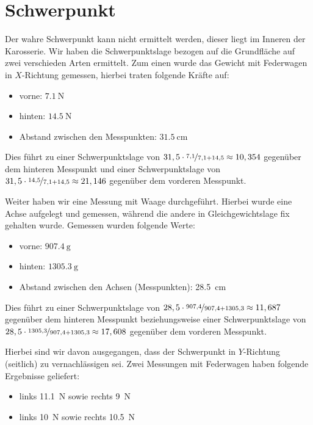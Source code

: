 \documentclass[10pt]{article}
\begin{document}
\section{Schwerpunkt}
    Der wahre Schwerpunkt kann nicht ermittelt werden, dieser liegt im Inneren der Karosserie.
    Wir haben die Schwerpunktslage bezogen auf die Grundfläche auf zwei verschieden Arten ermittelt.
    Zum einen wurde das Gewicht mit Federwagen in $X$-Richtung gemessen, hierbei traten folgende Kräfte auf:
    \begin{itemize}
    \item vorne: $\SI{7,1}{\newton}$
    \item hinten: $\SI{14,5}{\newton}$
    \item Abstand zwischen den Messpunkten: $\SI{31,5}{\cm}$
    \end{itemize}
    Dies führt zu einer Schwerpunktslage von $31,5 \cdot \nicefrac{7,1}{7,1+14,5} \approx 10,354$ gegenüber dem hinteren Messpunkt und einer Schwerpunktslage von $31,5 \cdot \nicefrac{14,5}{7,1+14,5} \approx 21,146$ gegenüber dem vorderen Messpunkt.

    Weiter haben wir eine Messung mit Waage durchgeführt.
    Hierbei wurde eine Achse aufgelegt und gemessen, während die andere in Gleichgewichtslage fix gehalten wurde. Gemessen wurden folgende Werte:
    \begin{itemize}
    \item vorne: $\SI{907,4}{\gram}$
    \item hinten: $\SI{1305,3}{\gram}$
    \item Abstand zwischen den Achsen (Messpunkten): \SI{28,5}{\cm}
    \end{itemize}
    Dies führt zu einer Schwerpunktslage von $28,5\cdot\nicefrac{907,4}{907,4+1305,3} \approx 11,687$ gegenüber dem hinteren Messpunkt beziehungsweise einer Schwerpunktslage von $28,5\cdot\nicefrac{1305,3}{907,4+1305,3} \approx 17,608$ gegenüber dem vorderen Messpunkt.


    Hierbei sind wir davon ausgegangen, dass der Schwerpunkt in $Y$-Richtung (seitlich) zu vernachlässigen sei. Zwei Messungen mit Federwagen haben folgende Ergebnisse geliefert:
    \begin{itemize}
        \item links \SI{11,1}{\newton} sowie rechts \SI{9}{\newton}
        \item links \SI{10}{\newton} sowie rechts \SI{10,5}{\newton}
    \end{itemize}
\end{document}
